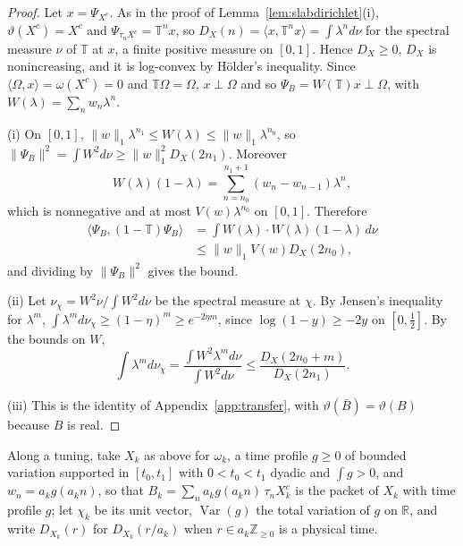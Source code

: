 \documentclass[aps,prd,twocolumn,superscriptaddress,nofootinbib,longbibliography,floatfix,amsmath,amssymb,10pt]{revtex4-2}
\theoremstyle{definition}
\theoremstyle{remark}
\newcommand{\R}{\mathbb{R}}
\newcommand{\Z}{\mathbb{Z}}
\newcommand{\Var}{\operatorname{Var}}
\newcommand{\ip}[2]{\langle #1,#2\rangle}
\begin{document}
\begin{proof}
Let $x=\Psi_{X^c}$. As in the proof of Lemma~\ref{lem:slabdirichlet}(i),
$\vartheta(X^c)=X^c$ and $\Psi_{\tau_nX^c}=\mathbb T^nx$, so
$D_X(n)=\ip x{\mathbb T^nx}=\int\lambda^nd\nu$ for the spectral measure $\nu$
of $\mathbb T$ at $x$, a finite positive measure on $[0,1]$. Hence $D_X\ge0$,
$D_X$ is nonincreasing, and it is log-convex by H\"older's inequality. Since
$\ip\Omega x=\omega(X^c)=0$ and $\mathbb T\Omega=\Omega$, $x\perp\Omega$ and
so $\Psi_B=W(\mathbb T)x\perp\Omega$, with $W(\lambda)=\sum_nw_n\lambda^n$.

(i) On $[0,1]$, $\|w\|_1\lambda^{n_1}\le W(\lambda)\le\|w\|_1\lambda^{n_0}$,
so $\|\Psi_B\|^2=\int W^2d\nu\ge\|w\|_1^2D_X(2n_1)$. Moreover
\[
W(\lambda)(1-\lambda)=\sum_{n=n_0}^{n_1+1}(w_n-w_{n-1})\lambda^n,
\]
which is nonnegative and at most $V(w)\lambda^{n_0}$ on $[0,1]$. Therefore
\[
\begin{split}
\ip{\Psi_B}{(1-\mathbb T)\Psi_B}&=\int W(\lambda)\cdot W(\lambda)
(1-\lambda)\,d\nu\\
&\le\|w\|_1V(w)D_X(2n_0),
\end{split}
\]
and dividing by $\|\Psi_B\|^2$ gives the bound.

(ii) Let $\nu_\chi=W^2\nu/\int W^2d\nu$ be the spectral measure at $\chi$.
By Jensen's inequality for $\lambda^m$, $\int\lambda^md\nu_\chi\ge
(1-\eta)^m\ge e^{-2\eta m}$, since $\log(1-y)\ge-2y$ on $[0,\frac12]$. By the
bounds on $W$,
\[
\int\lambda^md\nu_\chi=\frac{\int W^2\lambda^md\nu}{\int W^2d\nu}\le
\frac{D_X(2n_0+m)}{D_X(2n_1)} .
\]

(iii) This is the identity of Appendix~\ref{app:transfer}, with
$\vartheta(\bar B)=\vartheta(B)$ because $B$ is real.
\end{proof}

Along a tuning, take $X_k$ as above for $\omega_k$, a time profile $g\ge0$ of
bounded variation supported in $[t_0,t_1]$ with $0<t_0<t_1$ dyadic and
$\int g>0$, and $w_n=a_kg(a_kn)$, so that $B_k=\sum_na_kg(a_kn)\,\tau_nX_k^c$ is the packet of $X_k$ with
time profile $g$; let $\chi_k$ be its unit vector, $\Var(g)$ the total
variation of $g$ on $\R$, and write $D_{X_k}(r)$ for $D_{X_k}(r/a_k)$ when
$r\in a_k\Z_{\ge0}$ is a physical time.
\end{document}
